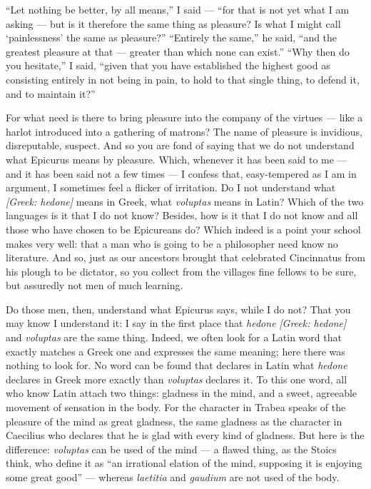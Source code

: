  ``Let nothing be better, by all means,'' I said — ``for that is not yet what I am asking — but is it therefore the same thing as pleasure? Is what I might call `painlessness' the same as pleasure?'' ``Entirely the same,'' he said, ``and the greatest pleasure at that — greater than which none can exist.'' ``Why then do you hesitate,'' I said, ``given that you have established the highest good as consisting entirely in not being in pain, to hold to that single thing, to defend it, and to maintain it?''

 For what need is there to bring pleasure into the company of the virtues — like a harlot introduced into a gathering of matrons? The name of pleasure is invidious, disreputable, suspect. And so you are fond of saying that we do not understand what Epicurus means by pleasure. Which, whenever it has been said to me — and it has been said not a few times — I confess that, easy-tempered as I am in argument, I sometimes feel a flicker of irritation. Do I not understand what \textit{[Greek: hedone]} means in Greek, what \textit{voluptas} means in Latin? Which of the two languages is it that I do not know? Besides, how is it that I do not know and all those who have chosen to be Epicureans do? Which indeed is a point your school makes very well: that a man who is going to be a philosopher need know no literature. And so, just as our ancestors brought that celebrated Cincinnatus from his plough to be dictator, so you collect from the villages fine fellows to be sure, but assuredly not men of much learning.

 Do those men, then, understand what Epicurus says, while I do not? That you may know I understand it: I say in the first place that \textit{hedone} \textit{[Greek: hedone]} and \textit{voluptas} are the same thing. Indeed, we often look for a Latin word that exactly matches a Greek one and expresses the same meaning; here there was nothing to look for. No word can be found that declares in Latin what \textit{hedone} declares in Greek more exactly than \textit{voluptas} declares it. To this one word, all who know Latin attach two things: gladness in the mind, and a sweet, agreeable movement of sensation in the body. For the character in Trabea speaks of the pleasure of the mind as great gladness, the same gladness as the character in Caecilius who declares that he is glad with every kind of gladness. But here is the difference: \textit{voluptas} can be used of the mind — a flawed thing, as the Stoics think, who define it as ``an irrational elation of the mind, supposing it is enjoying some great good'' — whereas \textit{laetitia} and \textit{gaudium} are not used of the body.

